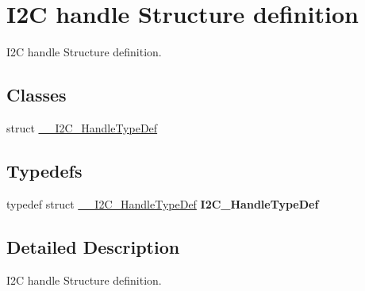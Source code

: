 \hypertarget{group___i2_c__handle___structure__definition}{}\section{I2C handle Structure definition}
\label{group___i2_c__handle___structure__definition}


I2C handle Structure definition.  


\subsection*{Classes}
\begin{DoxyCompactItemize}
\item 
struct \mbox{\hyperlink{struct_____i2_c___handle_type_def}{\+\_\+\+\_\+\+I2\+C\+\_\+\+Handle\+Type\+Def}}
\end{DoxyCompactItemize}
\subsection*{Typedefs}
\begin{DoxyCompactItemize}
\item 
\mbox{\label{group___i2_c__handle___structure__definition_ga68e9f45c2fd2161fb827ccdeabb55ea5}} 
typedef struct \mbox{\hyperlink{struct_____i2_c___handle_type_def}{\+\_\+\+\_\+\+I2\+C\+\_\+\+Handle\+Type\+Def}} {\bfseries I2\+C\+\_\+\+Handle\+Type\+Def}
\end{DoxyCompactItemize}


\subsection{Detailed Description}
I2C handle Structure definition. 

